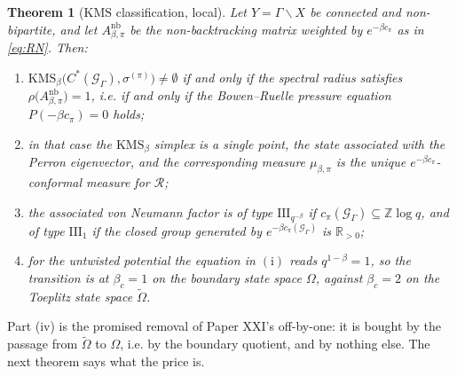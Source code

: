 \documentclass[11pt]{amsart}
\numberwithin{equation}{section}
\newtheorem{theorem}{Theorem}[section]
\theoremstyle{definition}
\theoremstyle{remark}
\newcommand{\Z}{\mathbb{Z}}
\newcommand{\R}{\mathbb{R}}
\newcommand{\cG}{\mathcal{G}}
\newcommand{\cR}{\mathcal{R}}
\newcommand{\KMS}{\mathrm{KMS}}
\begin{document}
\begin{theorem}[$\KMS$ classification, local]\label{thm:kms}
Let $Y=\Gamma\backslash X$ be connected and non-bipartite, and let
$A^{\mathrm{nb}}_{\beta,\pi}$ be the non-backtracking matrix weighted by
$e^{-\beta c_\pi}$ as in \eqref{eq:RN}. Then:
\begin{enumerate}
\item[(i)] $\KMS_\beta\bigl(C^*(\cG_\Gamma),\sigma^{(\pi)}\bigr)\neq\emptyset$ if and only
if the spectral radius satisfies $\rho\bigl(A^{\mathrm{nb}}_{\beta,\pi}\bigr)=1$, i.e.
if and only if the Bowen--Ruelle pressure equation $P(-\beta c_\pi)=0$ holds;
\item[(ii)] in that case the $\KMS_\beta$ simplex is a single point, the state
associated with the Perron eigenvector, and the corresponding measure $\mu_{\beta,\pi}$
is the unique $e^{-\beta c_\pi}$-conformal measure for $\cR$;
\item[(iii)] the associated von Neumann factor is of type $\mathrm{III}_{q^{-\beta}}$ if
$c_\pi(\cG_\Gamma)\subseteq\Z\log q$, and of type $\mathrm{III}_1$ if the closed group
generated by $e^{-\beta c_\pi(\cG_\Gamma)}$ is $\R_{>0}$;
\item[(iv)] for the untwisted potential the equation in $(\mathrm{i})$ reads
$q^{1-\beta}=1$, so the transition is at $\beta_c=1$ on the boundary state space
$\Omega$, against $\beta_c=2$ on the Toeplitz state space $\widetilde\Omega$.
\end{enumerate}
\end{theorem}

Part (iv) is the promised removal of Paper XXI's off-by-one: it is bought by the passage
from $\widetilde\Omega$ to $\Omega$, i.e. by the boundary quotient, and by nothing else.
The next theorem says what the price is.
\end{document}
